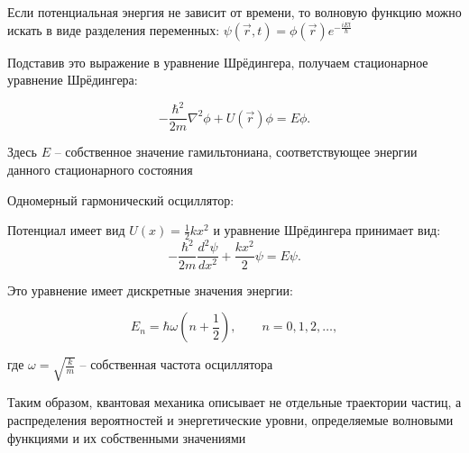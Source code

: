 \documentclass[12pt]{article}
\begin{document}
\mediumvspace

Если потенциальная энергия не зависит от времени, то волновую функцию можно искать в виде разделения переменных: $\psi(\vec r, t) = \phi(\vec r)e^{-\frac{iEt}{\hbar}}$

Подставив это выражение в уравнение Шрёдингера, получаем стационарное уравнение Шрёдингера:

\[
-\frac{\hbar^2}{2m}\nabla^2 \phi + U(\vec r)\phi = E\phi.
\]

Здесь $E$ -- собственное значение гамильтониана, соответствующее энергии данного стационарного состояния

\mediumvspace

\Ex Одномерный гармонический осциллятор:

Потенциал имеет вид $U(x) = \frac{1}{2}kx^2$ и уравнение Шрёдингера принимает вид:
\[
-\frac{\hbar^2}{2m}\frac{d^2\psi}{dx^2} + \frac{kx^2}{2}\psi = E\psi.
\]

Это уравнение имеет дискретные значения энергии:

\[
E_n = \hbar\omega\left(n + \frac{1}{2}\right), \qquad n = 0, 1, 2, \ldots,
\]

где $\omega = \sqrt{\frac{k}{m}}$ -- собственная частота осциллятора

\mediumvspace

Таким образом, квантовая механика описывает не отдельные траектории частиц, а распределения вероятностей и энергетические уровни, определяемые волновыми функциями и их собственными значениями
\end{document}
